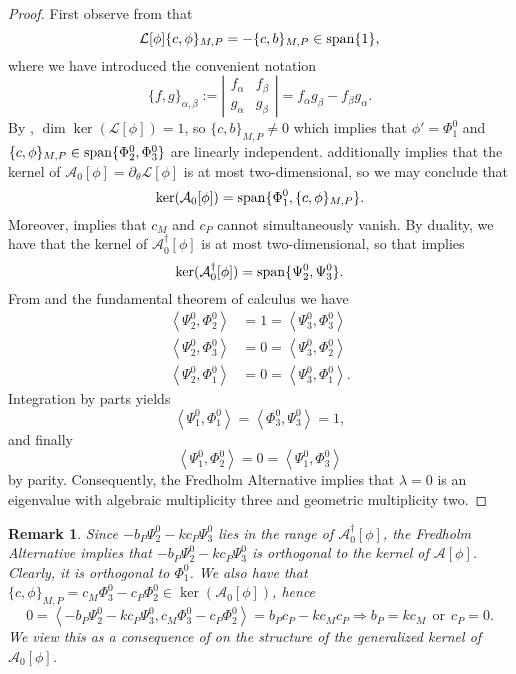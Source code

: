 \documentclass[11pt,leqno]{article}
\numberwithin{equation}{section}
\renewcommand\d{\partial}
\newcommand\LA{\left\langle}
\newcommand\RA{\right\rangle}
\newcommand{\Span}{{\rm span}}
\newtheorem{remark}[theorem]{Remark}
\theoremstyle{definition}
\begin{document}
\begin{proof}
First observe from  that 
\[
\mathcal{L}[\phi]\{c,\phi\}_{M,P} = -\{c, b\}_{M,P} \in \Span\{1\},
\]
where we have introduced the convenient notation
\[
\{f,g\}_{\alpha,\beta} := 
\left|\begin{array}{cc}
    f_\alpha & f_\beta \\
    g_\alpha & g_\beta
\end{array}\right| 
= f_\alpha g_\beta - f_\beta g_\alpha.
\]
By , $ \dim\ker(\mathcal{L}[\phi]) = 1 $, so $\{c,b\}_{M,P}\neq 0 $ which implies that $\phi' =\Phi_1^0 $ and $ \{c,\phi\}_{M,P}\in\Span\{\Phi_2^0, \Phi_3^0\} $ are linearly independent.  additionally implies that the kernel of $\mathcal{A}_0[\phi] = \d_\theta\mathcal{L}[\phi]$ is at most two-dimensional, so we may conclude that
\[
\ker(\mathcal{A}_0[\phi]) = \Span\{\Phi_1^0, \{c,\phi\}_{M,P}\}.
\]
Moreover,  implies that $c_M$ and $c_P$ cannot simultaneously vanish. By duality, we have that the kernel of $\mathcal{A}_0^\dagger[\phi]$ is at most two-dimensional, so that  implies
\[
\ker(\mathcal{A}_0^\dagger[\phi]) = \Span\{\Psi_2^0,\Psi_3^0\}.
\]
From  and the fundamental theorem of calculus we have
\begin{align*}
	\LA \Psi_2^0, \Phi_2^0\RA &=1 = \LA \Psi_3^0, \Phi_3^0\RA\\
	\LA \Psi_2^0, \Phi_3^0\RA &= 0 = \LA \Psi_3^0, \Phi_2^0\RA\\
	\LA \Psi_2^0, \Phi_1^0\RA &= 0 = \LA \Psi_3^0, \Phi_1^0\RA.
\end{align*}
Integration by parts yields
\[
\LA \Psi_1^0, \Phi_1^0\RA = \LA \Phi_3^0,\Psi_3^0\RA =1,
\]
and finally
\[
\LA \Psi_1^0, \Phi_2^0\RA = 0 = \LA \Psi_1^0, \Phi_3^0\RA
\]
by parity.  Consequently, the Fredholm Alternative implies that $\lambda=0$ is an eigenvalue with algebraic multiplicity three and geometric multiplicity two.
\end{proof}

\begin{remark}
Since $-b_P\Psi_2^0 - kc_P\Psi_3^0$ lies in the range of $\mathcal{A}_0^\dagger[\phi]$, the Fredholm Alternative implies that $-b_P\Psi_2^0 - kc_P\Psi_3^0$ is orthogonal to the kernel of $\mathcal{A}[\phi]$.  Clearly, it is orthogonal to $\Phi_1^0$.  We also have that $\{c,\phi\}_{M,P} = c_M\Phi_3^0 - c_P\Phi_2^0 \in \ker(\mathcal{A}_0[\phi])$, hence
\[
0 = \LA -b_P\Psi_2^0 - kc_P\Psi_3^0, c_M\Phi_3^0 - c_P\Phi_2^0\RA = b_Pc_P - kc_Mc_P \Longrightarrow b_P = kc_M ~~\text{or}~~ c_P=0.
\]
We view this as a consequence of  on the structure of the generalized kernel of $ \mathcal{A}_{0}[\phi] $.
\end{remark}
\end{document}
